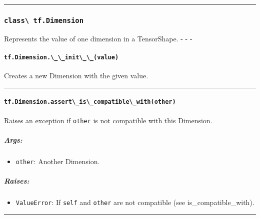 \begin{center}\rule{0.5\linewidth}{\linethickness}\end{center}

\subsubsection{\texorpdfstring{\lstinline{class\ tf.Dimension}
}{class tf.Dimension }}\label{class-tf.dimension}

Represents the value of one dimension in a TensorShape. - - -

\paragraph{\texorpdfstring{\lstinline{tf.Dimension.\_\_init\_\_(value)}
}{tf.Dimension.\_\_init\_\_(value) }}\label{tf.dimension.ux5fux5finitux5fux5fvalue}

Creates a new Dimension with the given value.

\begin{center}\rule{0.5\linewidth}{\linethickness}\end{center}

\paragraph{\texorpdfstring{\lstinline{tf.Dimension.assert\_is\_compatible\_with(other)}
}{tf.Dimension.assert\_is\_compatible\_with(other) }}\label{tf.dimension.assertux5fisux5fcompatibleux5fwithother}

Raises an exception if \lstinline{other} is not compatible with this
Dimension.

\subparagraph{Args: }\label{args-40}

\begin{itemize}
\tightlist
\item
  \lstinline{other}: Another Dimension.
\end{itemize}

\subparagraph{Raises: }\label{raises-25}

\begin{itemize}
\tightlist
\item
  \lstinline{ValueError}: If \lstinline{self} and \lstinline{other} are not
  compatible (see is\_compatible\_with).
\end{itemize}

\begin{center}\rule{0.5\linewidth}{\linethickness}\end{center}

